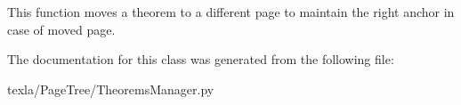 \begin{DoxyVerb}This function moves a theorem to a different page
to maintain the right anchor in case of moved page.\end{DoxyVerb}
 

The documentation for this class was generated from the following file\+:\begin{DoxyCompactItemize}
\item 
texla/\+Page\+Tree/Theorems\+Manager.\+py\end{DoxyCompactItemize}
